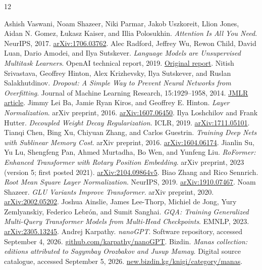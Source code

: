 \documentclass{article}
\begin{document}
\begin{thebibliography}{12}
\small
\raggedright
{} Ashish Vaswani, Noam Shazeer, Niki Parmar, Jakob Uszkoreit, Llion Jones, Aidan N. Gomez, Łukasz Kaiser, and Illia Polosukhin. \emph{Attention Is All You Need}. NeurIPS, 2017. \href{https://arxiv.org/abs/1706.03762}{arXiv:1706.03762}.
 Alec Radford, Jeffrey Wu, Rewon Child, David Luan, Dario Amodei, and Ilya Sutskever. \emph{Language Models are Unsupervised Multitask Learners}. OpenAI technical report, 2019. \href{https://cdn.openai.com/better-language-models/language_models_are_unsupervised_multitask_learners.pdf}{Original report}.
 Nitish Srivastava, Geoffrey Hinton, Alex Krizhevsky, Ilya Sutskever, and Ruslan Salakhutdinov. \emph{Dropout: A Simple Way to Prevent Neural Networks from Overfitting}. Journal of Machine Learning Research, 15:1929--1958, 2014. \href{https://jmlr.org/papers/v15/srivastava14a.html}{JMLR article}.
 Jimmy Lei Ba, Jamie Ryan Kiros, and Geoffrey E. Hinton. \emph{Layer Normalization}. arXiv preprint, 2016. \href{https://arxiv.org/abs/1607.06450}{arXiv:1607.06450}.
 Ilya Loshchilov and Frank Hutter. \emph{Decoupled Weight Decay Regularization}. ICLR, 2019. \href{https://arxiv.org/abs/1711.05101}{arXiv:1711.05101}.
 Tianqi Chen, Bing Xu, Chiyuan Zhang, and Carlos Guestrin. \emph{Training Deep Nets with Sublinear Memory Cost}. arXiv preprint, 2016. \href{https://arxiv.org/abs/1604.06174}{arXiv:1604.06174}.
 Jianlin Su, Yu Lu, Shengfeng Pan, Ahmed Murtadha, Bo Wen, and Yunfeng Liu. \emph{RoFormer: Enhanced Transformer with Rotary Position Embedding}. arXiv preprint, 2023 (version 5; first posted 2021). \href{https://arxiv.org/abs/2104.09864v5}{arXiv:2104.09864v5}.
 Biao Zhang and Rico Sennrich. \emph{Root Mean Square Layer Normalization}. NeurIPS, 2019. \href{https://arxiv.org/abs/1910.07467}{arXiv:1910.07467}.
 Noam Shazeer. \emph{GLU Variants Improve Transformer}. arXiv preprint, 2020. \href{https://arxiv.org/abs/2002.05202}{arXiv:2002.05202}.
 Joshua Ainslie, James Lee-Thorp, Michiel de Jong, Yury Zemlyanskiy, Federico Lebrón, and Sumit Sanghai. \emph{GQA: Training Generalized Multi-Query Transformer Models from Multi-Head Checkpoints}. EMNLP, 2023. \href{https://arxiv.org/abs/2305.13245}{arXiv:2305.13245}.
 Andrej Karpathy. \emph{nanoGPT}. Software repository, accessed September 4, 2026. \href{https://github.com/karpathy/nanoGPT}{github.com/karpathy/nanoGPT}.
 Bizdin. \emph{Manas collection: editions attributed to Sagymbay Orozbakov and Jusup Mamay}. Digital source catalogue, accessed September 5, 2026. \href{https://new.bizdin.kg/knigi/category/manas}{new.bizdin.kg/knigi/category/manas}.
\end{thebibliography}
\end{document}
